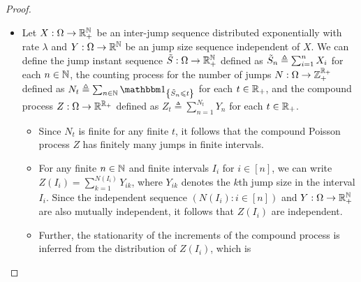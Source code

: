 \documentclass[a4paper,english,10pt]{article}
\begin{document}
\begin{proof}
\begin{itemize}
\item[Converse:] Let $X:\Omega\to\mathbb{R}_+^{\mathbb{N}}$ be an \iid inter-jump sequence distributed exponentially with rate $\lambda$ and $Y:\Omega\to\mathbb{R}^{\mathbb{N}}$ be an \iid jump size sequence independent of $X$. 
We can define the jump instant sequence $\tilde{S}:\Omega\to\mathbb{R}_+^{\mathbb{N}}$ defined as $\tilde{S}_n \triangleq \sum_{i=1}^nX_i$ for each $n\in\mathbb{N}$, 
the counting process for the number of jumps $N:\Omega\to\mathbb{Z}_+^{\mathbb{R}_+}$ defined as $N_t \triangleq \sum_{n\in\N}\SetIn{\tS_n \le t}$ for each $t\in\mathbb{R}_+$, 
and the compound process $Z:\Omega\to\mathbb{R}^{\mathbb{R}_+}$  defined as $Z_t \triangleq \sum_{n =1}^{N_t}Y_n$ for each $t\in\mathbb{R}_+$. 
\begin{itemize}
\item[Finitely many jumps:] Since $N_t$ is finite for any finite $t$, it follows that the compound Poisson process $Z$ has finitely many jumps in finite intervals. 
\item[Independence of increments:] For any finite $n \in \mathbb{N}$ and finite intervals $I_i$ for $i \in [n]$, 
we can write $Z(I_i)= \sum_{k=1}^{N(I_i)}Y_{ik}$, where $Y_{ik}$ denotes the $k$th jump size in the interval $I_i$. 
Since the independent sequence $(N(I_i): i \in [n])$ and $Y:\Omega\to\mathbb{R}_+^{\mathbb{N}}$ are also mutually independent, 
it follows that $Z(I_i)$ are independent. 
\item[Stationarity of increments:] Further, the stationarity of the increments of the compound process is inferred from the distribution of $Z(I_i)$, which is 
\end{itemize}
\end{itemize}
\end{proof}
\end{document}
